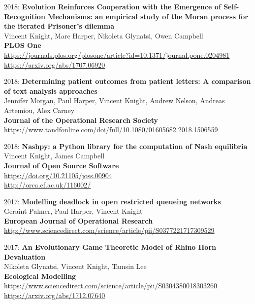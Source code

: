 \documentclass[10pt]{res} %
\begin{document}
\begin{resume}
\begin{etaremune}
\item
2018: \textbf{Evolution Reinforces Cooperation with the Emergence of Self-Recognition Mechanisms: an empirical study of the Moran process for the iterated Prisoner's dilemma }\\
Vincent Knight, Marc Harper, Nikoleta Glynatsi, Owen Campbell
\\
\textbf{PLOS One}
\\
\url{https://journals.plos.org/plosone/article?id=10.1371/journal.pone.0204981}
\\
\url{https://arxiv.org/abs/1707.06920}
\\

\item
2018: \textbf{Determining patient outcomes from patient letters: A comparison of text analysis approaches}\\
Jennifer Morgan, Paul Harper, Vincent Knight, Andrew Nelson, Andreas Artemiou, Alex Carney
\\
\textbf{Journal of the Operational Research Society}
\\
\url{https://www.tandfonline.com/doi/full/10.1080/01605682.2018.1506559}
\\

\item
2018: \textbf{Nashpy: a Python library for the computation of Nash equilibria}\\
Vincent Knight, James Campbell
\\
\textbf{Journal of Open Source Software}
\\
\url{https://doi.org/10.21105/joss.00904}
\\
\url{http://orca.cf.ac.uk/116002/}
\\

\item
2017: \textbf{Modelling deadlock in open restricted queueing networks}\\
Geraint Palmer, Paul Harper, Vincent Knight
\\
\textbf{European Journal of Operational Research}
\\
\url{http://www.sciencedirect.com/science/article/pii/S0377221717309529}
\\

\item
2017: \textbf{An Evolutionary Game Theoretic Model of Rhino Horn Devaluation}\\
Nikoleta Glynatsi, Vincent Knight, Tamsin Lee
\\
\textbf{Ecological Modelling}
\\
\url{https://www.sciencedirect.com/science/article/pii/S0304380018303260}
\\
\url{https://arxiv.org/abs/1712.07640}
\\


\end{etaremune}
\end{resume}
\end{document}
